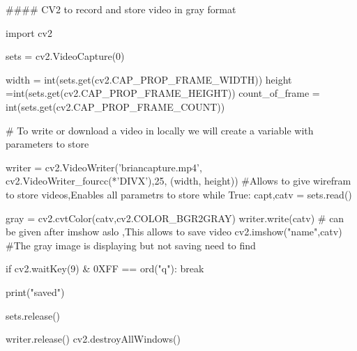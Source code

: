 #### CV2 to record and store video in gray format


import cv2

sets = cv2.VideoCapture(0)

width = int(sets.get(cv2.CAP_PROP_FRAME_WIDTH))
height =int(sets.get(cv2.CAP_PROP_FRAME_HEIGHT))
count_of_frame = int(sets.get(cv2.CAP_PROP_FRAME_COUNT))

# To write or download a video in locally we will create a variable with parameters to store

writer = cv2.VideoWriter('briancapture.mp4', cv2.VideoWriter_fourcc(*'DIVX'),25, (width, height))   #Allows to give wirefram to store videos,Enables all parametrs to store
while True:
    capt,catv = sets.read()
   
    gray = cv2.cvtColor(catv,cv2.COLOR_BGR2GRAY)
    writer.write(catv)   # can be given after imshow aslo ,This allows to save video
    cv2.imshow("name",catv) #The gray image is displaying but not saving need to find
    
    if cv2.waitKey(9) & 0XFF == ord("q"):
        break
        
print("saved")

sets.release()

writer.release()
cv2.destroyAllWindows()
